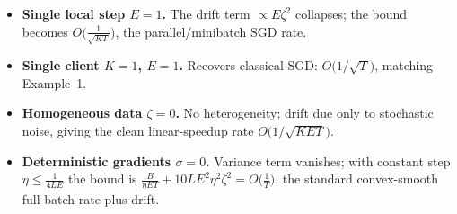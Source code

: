 \documentclass[11pt]{article}
\begin{document}
\begin{itemize}
  \item \textbf{Single local step $E=1$.}
  The drift term $\propto E\zeta^2$ collapses; the bound becomes
  $O\!\big(\frac{1}{\sqrt{KT}}\big)$, the parallel/minibatch SGD rate.
  \item \textbf{Single client $K=1$, $E=1$.}
  Recovers classical SGD: $O\!\big(1/\sqrt{T}\big)$, matching Example~1.
  \item \textbf{Homogeneous data $\zeta = 0$.}
  No heterogeneity; drift due only to stochastic noise, giving the clean
  linear-speedup rate $O\!\big(1/\sqrt{KET}\big)$.
  \item \textbf{Deterministic gradients $\sigma = 0$.}
  Variance term vanishes; with constant step $\eta\le\frac{1}{4LE}$ the bound is
  $\frac{B}{\eta E T} + 10LE^2\eta^2\zeta^2 = O\!\big(\frac{1}{T}\big)$,
  the standard convex-smooth full-batch rate plus drift.
\end{itemize}
\end{document}
